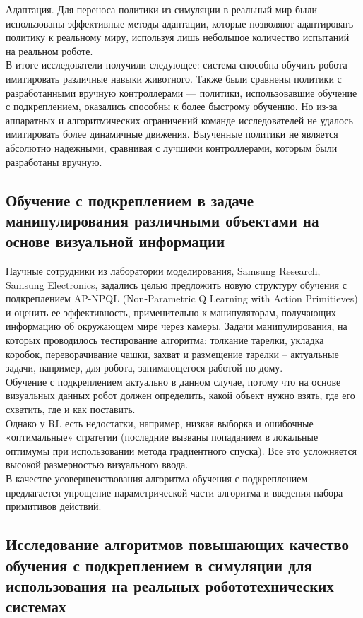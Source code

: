 \documentclass[12 pt, a4paper]{article}
\theoremstyle{definition}
\theoremstyle{plain}
\theoremstyle{remark}
\begin{document}
Адаптация. Для переноса политики из симуляции в реальный мир были использованы эффективные методы адаптации, которые позволяют адаптировать политику к реальному миру, используя лишь небольшое количество испытаний на реальном роботе.\\
В итоге исследователи получили следующее: система способна обучить робота имитировать различные навыки животного. Также были сравнены политики с разработанными вручную контроллерами — политики, использовавшие обучение с подкреплением, оказались способны к более быстрому обучению. Но из-за аппаратных и алгоритмических ограничений команде исследователей не удалось имитировать более динамичные движения. Выученные политики не является абсолютно надежными, сравнивая с лучшими контроллерами, которым были разработаны вручную.




\subsection{Обучение с подкреплением в задаче манипулирования различными объектами на основе визуальной информации \cite{litlink5}}
Научные сотрудники из лаборатории моделирования, Samsung Research, Samsung Electronics, задались целью предложить новую структуру обучения с подкреплением AP-NPQL (Non-Parametric Q Learning with Action Primitieves) и оценить ее эффективность, применительно к манипуляторам, получающих информацию об окружающем мире через камеры. 
Задачи манипулирования, на которых проводилось тестирование алгоритма: толкание тарелки, укладка коробок, переворачивание чашки, захват и размещение тарелки – актуальные задачи, например, для робота, занимающегося работой по дому.\\
Обучение с подкреплением актуально в данном случае, потому что на основе визуальных данных робот должен определить, какой объект нужно взять, где его схватить, где и как поставить. \\
Однако у RL есть недостатки, например, низкая выборка и ошибочные «оптимальные» стратегии (последние вызваны попаданием в локальные оптимумы при использовании метода градиентного спуска). Все это усложняется высокой размерностью визуального ввода.\\
В качестве усовершенствования алгоритма обучения с подкреплением предлагается упрощение параметрической части алгоритма и введения набора примитивов действий.

\subsection{Исследование алгоритмов повышающих качество обучения с подкреплением в симуляции для использования на реальных робототехнических системах  \cite{litlink6}}
\end{document}
